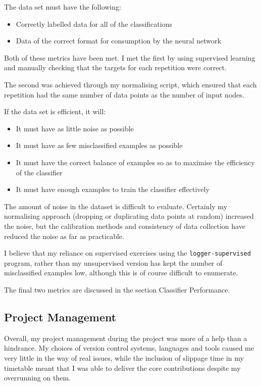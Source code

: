 \documentclass[a4paper]{article}
\begin{document}
The data set must have the following:

\begin{itemize}
\item Correctly labelled data for all of the classifications
\item Data of the correct format for consumption by the neural network
\end{itemize}

Both of these metrics have been met. I met the first by using supervised learning and manually checking that the targets for each repetition were correct.

The second was achieved through my normalising script, which ensured that each repetition had the same number of data points as the number of input nodes.

If the data set is efficient, it will:

\begin{itemize}
\item It must have as little noise as possible
\item It must have as few misclassified examples as possible
\item It must have the correct balance of examples so as to maximise the efficiency of the classifier
\item It must have enough examples to train the classifier effectively
\end{itemize}

The amount of noise in the dataset is difficult to evaluate. Certainly my normalising approach (dropping or duplicating data points at random) increased the noise, but the calibration methods and consistency of data collection have reduced the noise as far as practicable.

I believe that my reliance on supervised exercises using the \lstinline{logger-supervised} program, rather than my unsupervised version has kept the number of misclassified examples low, although this is of course difficult to enumerate.

The final two metrics are discussed in the section Classifier Performance.

\subsection{Project Management}%

Overall, my project management during the project was more of a help than a hindrance. My choices of version control systems, languages and tools caused me very little in the way of real issues, while the inclusion of slippage time in my timetable meant that I was able to deliver the core contributions despite my overrunning on them.
\end{document}
